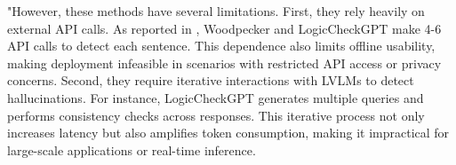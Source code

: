 \begin{table}[t]
\centering
{}
\caption{Statistics of Calling OpenAI API and Module usage of LVLM hallucination detections.}
\label{tab:stat}
\vspace{-10pt}

\end{table}

"However, these methods have several limitations. First, they rely heavily on external API calls.
As reported in , Woodpecker and LogicCheckGPT make 4-6 API calls to detect each sentence.
This dependence also limits offline usability, making deployment infeasible in scenarios with restricted API access or privacy concerns.
Second, they require iterative interactions with LVLMs to detect hallucinations.
For instance, LogicCheckGPT generates multiple queries and performs consistency checks across responses. This iterative process not only increases latency but also amplifies token consumption, making it impractical for large-scale applications or real-time inference.

